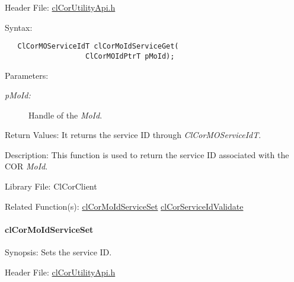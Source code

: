 \begin{Desc}
\item[Header File:]\hyperlink{cl_cor_utility_api_8h}{cl\-Cor\-Utility\-Api.h}\end{Desc}
\begin{Desc}
\item[Syntax:]

\footnotesize\begin{verbatim}   ClCorMOServiceIdT clCorMoIdServiceGet(
                   ClCorMOIdPtrT pMoId);
\end{verbatim}
\normalsize
\end{Desc}
\begin{Desc}
\item[Parameters:]
\begin{description}
\item[{\em p\-Mo\-Id:}]Handle of the {\em Mo\-Id\/}.\end{description}
\end{Desc}
\begin{Desc}
\item[Return Values:]It returns the service ID through {\em Cl\-Cor\-MOService\-Id\-T\/}.\end{Desc}
\begin{Desc}
\item[Description:]This function is used to return the service ID associated with the COR {\em Mo\-Id\/}.\end{Desc}
\begin{Desc}
\item[Library File:]Cl\-Cor\-Client\end{Desc}
\begin{Desc}
\item[Related Function(s):]\hyperlink{group__group13}{cl\-Cor\-Mo\-Id\-Service\-Set} \hyperlink{group__group13}{cl\-Cor\-Service\-Id\-Validate} \end{Desc}
\hypertarget{pagecor247}{}\paragraph{cl\-Cor\-Mo\-Id\-Service\-Set}\label{pagecor247}
\begin{Desc}
\item[Synopsis:]Sets the service ID.\end{Desc}
\begin{Desc}
\item[Header File:]\hyperlink{cl_cor_utility_api_8h}{cl\-Cor\-Utility\-Api.h}\end{Desc}
